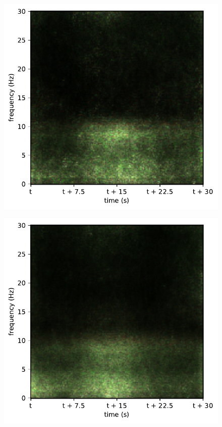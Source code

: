 \begin{subfigure}{.16\textwidth}
  \centering
  \includegraphics[width=1\linewidth]{./pics/class_master_0}
  \caption{}
  \label{fig_1_21}
\end{subfigure}%
\begin{subfigure}{.16\textwidth}
  \centering
  \includegraphics[width=1\linewidth]{./pics/class_master_1}
  \caption{}
  \label{fig_1_22}
\end{subfigure}%
